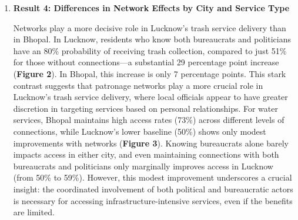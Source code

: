 \begin{enumerate}[left=0pt]
    Personal connections to politicians, bureaucrats, or both play a crucial role in securing trash services, particularly in Lucknow. Predicted probabilities show the likelihood of receiving a service based on different levels of network connections, helping to visualize how these social ties affect access (\textbf{Figure 1}). Residents with connections to both bureaucrats and politicians have a 78\% probability of receiving trash services, compared to 55\% for those without connections. This strong positive progression suggests that personal networks significantly enhance access to trash services. In contrast, water service access remains largely unaffected by network connections in both cities, highlighting that infrastructure-heavy services like water are less amenable to influence through personal connections. Even having connections to both bureaucrats and politicians only modestly increases the probability to 67\% (compared to 63\% for those without connections). This limited impact of connections on water access is supported by regression results showing weaker or non-significant effects of network ties, suggesting that water service access operates largely independently of personal networks.

    \item \textbf{Result 4: Differences in Network Effects by City and Service Type}

    Networks play a more decisive role in Lucknow’s trash service delivery than in Bhopal. In Lucknow, residents who know both bureaucrats and politicians have an 80\% probability of receiving trash collection, compared to just 51\% for those without connections—a substantial 29 percentage point increase (\textbf{Figure 2}). In Bhopal, this increase is only 7 percentage points. This stark contrast suggests that patronage networks play a more crucial role in Lucknow's trash service delivery, where local officials appear to have greater discretion in targeting services based on personal relationships. For water services, Bhopal maintains high access rates (73\%) across different levels of connections, while Lucknow’s lower baseline (50\%) shows only modest improvements with networks (\textbf{Figure 3}). Knowing bureaucrats alone barely impacts access in either city, and even maintaining connections with both bureaucrats and politicians only marginally improves access in Lucknow (from 50\% to 59\%). However, this modest improvement underscores a crucial insight: the coordinated involvement of both political and bureaucratic actors is necessary for accessing infrastructure-intensive services, even if the benefits are limited.


\end{enumerate}
